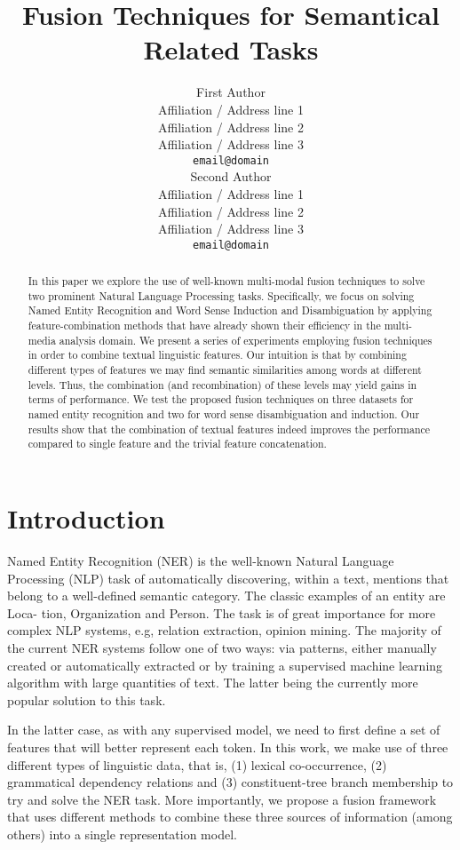 \documentclass[11pt]{article}
\title{Fusion Techniques for Semantical Related Tasks}
\author{First Author\\
  Affiliation / Address line 1 \\
  Affiliation / Address line 2 \\
  Affiliation / Address line 3 \\
  {\tt email@domain} \\\And
  Second Author \\
  Affiliation / Address line 1 \\
  Affiliation / Address line 2 \\
  Affiliation / Address line 3 \\
  {\tt email@domain} \\}
\date{}
\begin{document}
\maketitle
\begin{abstract}
In this paper we explore the use of well-known multi-modal fusion techniques to solve two prominent Natural Language Processing tasks. Specifically, we focus on solving Named Entity Recognition and Word Sense Induction and Disambiguation by applying feature-combination methods that have already shown their efficiency in the multi-media analysis domain. We present a series of experiments employing fusion techniques in order to combine textual linguistic features. Our intuition is that by combining different types of features we may find semantic similarities among words at different levels. Thus, the combination (and recombination) of these levels may yield gains in terms of performance.
We test the proposed fusion techniques on three datasets for named entity recognition and two for word sense disambiguation and induction. Our results show that the combination of textual features indeed improves the performance compared to single feature and the trivial feature concatenation.
\end{abstract}


\section{Introduction}
Named Entity Recognition (NER) is the well-known Natural Language Processing (NLP) task
of automatically discovering, within a text, mentions that belong to a well-defined semantic category. The classic examples of an entity are Loca-
tion, Organization and Person. The task is of great importance for more complex NLP systems, e.g, relation extraction, opinion mining. The majority of the current NER systems follow one of two ways: via patterns, either manually created or automatically extracted or by training a supervised machine learning algorithm with large quantities
of text. The latter being the currently more popular solution to this task.

In the latter case, as with any supervised model, we need to first define a set of features that will
better represent each token. In this work, we make use of three different types of linguistic data,
that is, (1) lexical co-occurrence, (2) grammatical dependency relations and (3) constituent-tree branch membership to try and solve the NER task.
More importantly, we propose a fusion framework that uses different methods to combine these three sources of information (among others) into a single representation model.
\end{document}
